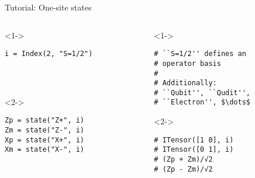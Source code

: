 \begin{frame}[fragile]{Tutorial: One-site states}

\begin{columns}

\begin{column}{4.5cm}

\begin{onlyenv}<1->

\begin{lstlisting}[language=JuliaLocal, style=julia, basicstyle=\small]
i = Index(2, "S=1/2")




 \end{lstlisting}

\end{onlyenv}

\begin{onlyenv}<2->

\begin{lstlisting}[language=JuliaLocal, style=julia, basicstyle=\small]
Zp = state("Z+", i)
Zm = state("Z-", i)
Xp = state("X+", i)
Xm = state("X-", i)
\end{lstlisting}

\end{onlyenv}

\end{column}

\begin{column}{4.5cm}

\begin{onlyenv}<1->

\begin{lstlisting}[style=julia, numbers=none, mathescape, basicstyle=\small]
# ``S=1/2'' defines an
# operator basis
#
# Additionally:
# ``Qubit'', ``Qudit'',
# ``Electron'', $\dots$
\end{lstlisting}

\end{onlyenv}

\begin{onlyenv}<2->

\begin{lstlisting}[style=julia, numbers=none, mathescape, basicstyle=\small]
# ITensor([1 0], i)
# ITensor([0 1], i)
# (Zp + Zm)/√2
# (Zp - Zm)/√2
\end{lstlisting}

\end{onlyenv}

\end{column}

\end{columns}

\end{frame}
